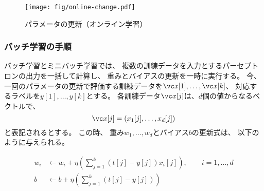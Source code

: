 \begin{figure}
  \centering
  \texttt{[image: fig/online-change.pdf]}
  \caption{パラメータの更新（オンライン学習）}
  \label{fig:online-change}
\end{figure}



\subsubsection{バッチ学習の手順}
\label{sec:batch-error-correction}

バッチ学習とミニバッチ学習では、
複数の訓練データを入力とするパーセプトロンの出力を一括して計算し、
重みとバイアスの更新を一時に実行する。
今、
一回のパラメータの更新で評価する訓練データを$\vc x[1], \dots, \vc x[k]$、
対応するラベルを$y[1], \dots, y[k]$とする。
各訓練データ$\vc x[j]$は、$d$個の値からなるベクトルで、
\[
  \vc x[j] = (x_1[j], \dots, x_d[j])
\]
と表記されるとする。
この時、
重み$w_1, \dots, w_d$とバイアス$b$の更新式は、
以下のように与えられる。

\begin{screen}
  \begin{align}
    \label{eq:4}
    w_i & \leftarrow w_i + \eta\left(\sum_{j=1}^k
          \left(t[j] - y[j]\right) x_i[j]\right),
    \qquad i = 1, \dots, d\\
          \label{eq:5}
    b & \leftarrow b + \eta\left(\sum_{j=1}^k
        \left(t[j] - y[j]\right)\right)
  \end{align}
\end{screen}

